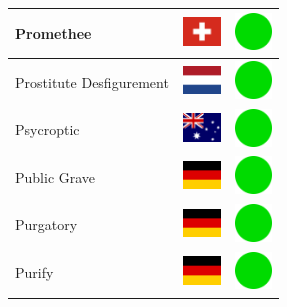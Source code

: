 \documentclass[12pt, a4paper, twoside]{report}
\begin{document}
\begin{center}
\begin{longtable}{|p{5cm}|p{2cm}|p{2cm}|}
 Promethee                                                  & \includegraphics[width=1cm]{../img/flags/ch} &   \includegraphics[width=1cm]{../likes/y} \\ \hline
 Prostitute Desfigurement                                   & \includegraphics[width=1cm]{../img/flags/nl} &   \includegraphics[width=1cm]{../likes/y} \\ \hline
 Psycroptic                                                 & \includegraphics[width=1cm]{../img/flags/au} &   \includegraphics[width=1cm]{../likes/y} \\ \hline
 Public Grave                                               & \includegraphics[width=1cm]{../img/flags/de} &   \includegraphics[width=1cm]{../likes/y} \\ \hline
 Purgatory                                                  & \includegraphics[width=1cm]{../img/flags/de} &   \includegraphics[width=1cm]{../likes/y} \\ \hline
 Purify                                                     & \includegraphics[width=1cm]{../img/flags/de} &   \includegraphics[width=1cm]{../likes/y} \\ \hline

\end{longtable}
\end{center}
\end{document}
